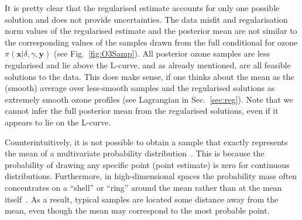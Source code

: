 It is pretty clear that the regularised estimate accounts for only one possible solution and does not provide uncertainties. 
The data misfit and regularisation norm values of the regularised estimate and the posterior mean are not similar to the corresponding values of the samples drawn from the full conditional for ozone $\pi(\bm{x}| \delta, \gamma,\bm{y})$ (see Fig.~\ref{fig:O3Samp}).
All posterior ozone samples are less regularised and lie above the L-curve, and as already mentioned, are all feasible solutions to the data.
This does make sense, if one thinks about the mean as the (smooth) average over less-smooth samples and the regularised solutions as extremely smooth ozone profiles (see Lagrangian in Sec.~\ref{sec:reg}).
Note that we cannot infer the full posterior mean from the regularised solutions, even if it appears to lie on the L-curve.

Counterintuitively, it is not possible to obtain a sample that exactly represents the mean of a multivariate probability distribution~\cite[Sec.~3.1]{VershyninMultiD2018}. 
This is because the probability of drawing any specific point (point estimate) is zero for continuous distributions.
Furthermore, in high-dimensional spaces the probability mass often concentrates on a “shell” or “ring” around the mean rather than at the mean itself~\cite{VowelsMultiD}. As a result, typical samples are located some distance away from the mean, even though the mean may correspond to the most probable point.




